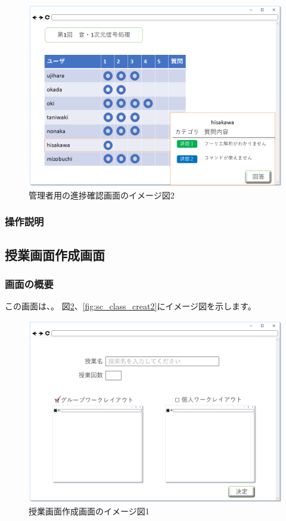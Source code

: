 \begin{figure}[htbp]
\begin{center}
  \includegraphics[width=1\linewidth,clip]{./img/sc_prog_check_one2.png}
  \caption{管理者用の進捗確認画面のイメージ図2}\label{fig:sc_prog_check_one2}
\end{center}
\end{figure}

\subsubsection{操作説明}

\subsection{授業画面作成画面}
\subsubsection{画面の概要}
この画面は、。
図\ref{fig:sc_class_creat1}、\ref{fig:sc_class_creat2}にイメージ図を示します。

\begin{figure}[htbp]
\begin{center}
  \includegraphics[width=1\linewidth,clip]{./img/sc_class_creat1.png}
  \caption{授業画面作成画面のイメージ図1}\label{fig:sc_class_creat1}
\end{center}
\end{figure}

